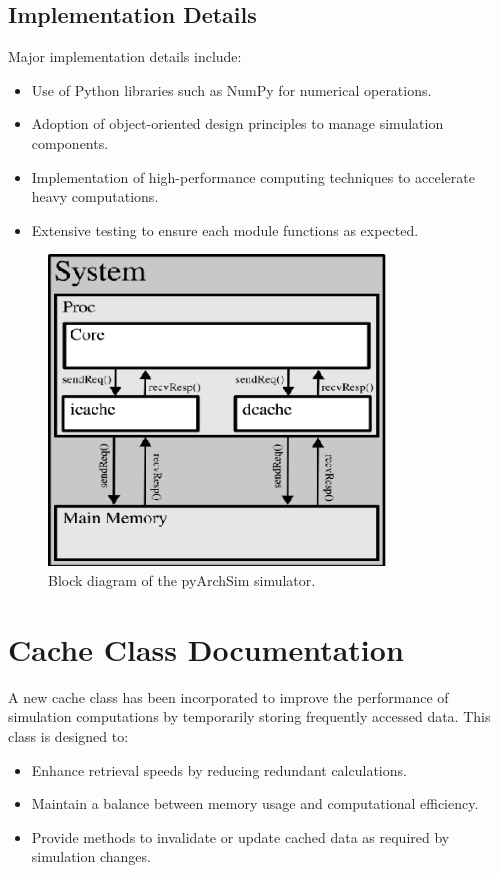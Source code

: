 \documentclass[12pt,a4paper]{report}
\begin{document}
\subsection{Implementation Details}
Major implementation details include:
\begin{itemize}
  \item Use of Python libraries such as NumPy for numerical operations.
  \item Adoption of object-oriented design principles to manage simulation components.
  \item Implementation of high-performance computing techniques to accelerate heavy computations.
  \item Extensive testing to ensure each module functions as expected.
\end{itemize}

\begin{figure}[h!]
  \centering
  \includegraphics[width=0.8\textwidth]{figs/png/overview.png}
  \caption{Block diagram of the pyArchSim simulator.}
  \label{fig:simulator_overview}
\end{figure}

\section{Cache Class Documentation}
A new cache class has been incorporated to improve the performance of simulation computations by temporarily storing frequently accessed data. This class is designed to:
\begin{itemize}
  \item Enhance retrieval speeds by reducing redundant calculations.
  \item Maintain a balance between memory usage and computational efficiency.
  \item Provide methods to invalidate or update cached data as required by simulation changes.
\end{itemize}
\end{document}
